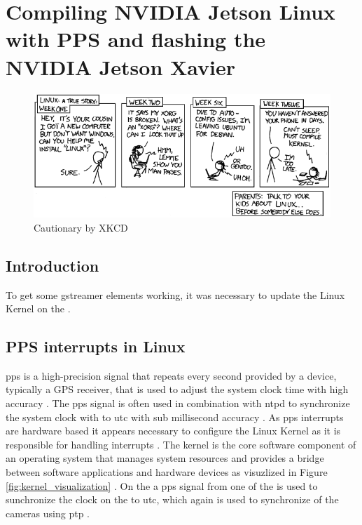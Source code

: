 

\chapter{Compiling NVIDIA Jetson Linux with PPS and flashing the NVIDIA Jetson Xavier}
\label{chap:flashing_xavier}
\begin{figure}[H]
    \centering
    \includegraphics[width=\textwidth]{figures/cautionary.png}
    \caption{Cautionary by XKCD \cite{xkcdCautionary2008}}
    \label{fig:xkcd_cautionary}
\end{figure}

\section{Introduction}
To get some \gls{gstreamer} elements working, it was necessary to update the Linux Kernel on the \jx \cite{martensProblemsNvvidconvVideo2023}.


\section{PPS interrupts in Linux}
\review
\gls{pps} is a high-precision signal that repeats every second provided by a device, typically a GPS receiver, that is used to adjust the system clock time with high accuracy \cite{giomettiLinuxPPSWikiLinuxPPS2007}.
The \gls{pps} signal is often used in combination with \gls{ntpd} to synchronize the system clock with to \gls{utc} with sub millisecond accuracy \cite{giomettiLinuxPPSWikiLinuxPPS2007}.
As \gls{pps} interrupts are hardware based it appears necessary to configure the Linux Kernel as it is responsible for handling interrupts \cite{giomettiLinuxPPSWikiLinuxPPS2007}.
The kernel is the core software component of an operating system that manages system resources and provides a bridge between software applications and hardware devices as visuzlized in Figure \ref{fig:kernel_visualization} \cite{thekerneldevelopmentcommunityInterruptsLinuxKernel}.
On the \sr a \gls{pps} signal from one of the  is used to sunchronize the clock on the \jx to \gls{utc}, which again is used to synchronize of the cameras using \gls{ptp} \cite{martensPortableSensorRig2022}.

